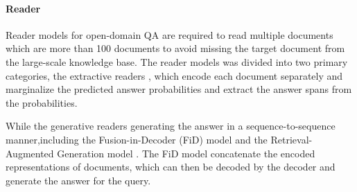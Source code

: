 \paragraph{Reader} Reader models for open-domain QA are required to read multiple documents which are more than 100 documents to avoid missing the target document from the large-scale knowledge base. The reader models was divided into two primary categories, the extractive readers \cite{karpukhin2020dense}, which encode each document separately and marginalize the predicted answer probabilities and extract the answer spans from the probabilities.

While the generative readers generating the answer in a sequence-to-sequence manner,including the Fusion-in-Decoder (FiD) model \cite{izacard2020leveraging} and the Retrieval-Augmented Generation model \cite{lewis2020retrieval}. The FiD model concatenate the encoded representations of documents, which can then be decoded by the decoder and generate the answer for the query. 
